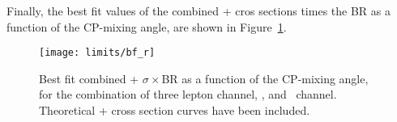 Finally, the best fit values of the combined \tH + \ttH cros sections times the BR as a function of the CP-mixing angle, are shown in Figure~\ref{fig:bf_r}. 

\begin{figure} [!h]
      \centering
      \texttt{[image: limits/bf\_r]}\\
      \caption[Best fit combined \tH + \ttH $\sigma\times$BR as a function of the CP-mixing angle.]{Best fit combined \tH + \ttH $\sigma\times$BR as a function of the CP-mixing angle, for the combination of three lepton channel, \mumu, and \emu\ channel. Theoretical \tH + \ttH cross section curves have been included.}
\label{fig:bf_r}
\end{figure}
